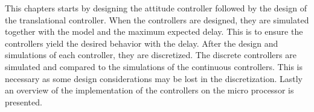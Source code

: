 
This chapters starts by designing the attitude controller followed by the design of the translational controller. When the controllers are designed, they are simulated together with the model and the maximum expected delay. This is to ensure the controllers yield the desired behavior with the delay. After the design and simulations of each controller, they are discretized. The discrete controllers are simulated and compared to the simulations of the continuous controllers. This is necessary as some design considerations may be lost in the discretization. Lastly an overview of the implementation of the controllers on the micro processor is presented. 